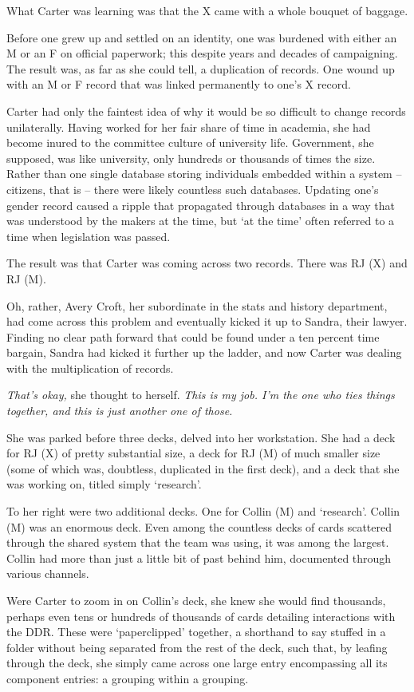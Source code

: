 What Carter was learning was that the X came with a whole bouquet of baggage.

Before one grew up and settled on an identity, one was burdened with either an M or an F on official paperwork; this despite years and decades of campaigning. The result was, as far as she could tell, a duplication of records. One wound up with an M or F record that was linked permanently to one's X record.

Carter had only the faintest idea of why it would be so difficult to change records unilaterally. Having worked for her fair share of time in academia, she had become inured to the committee culture of university life. Government, she supposed, was like university, only hundreds or thousands of times the size. Rather than one single database storing individuals embedded within a system -- citizens, that is -- there were likely countless such databases. Updating one's gender record caused a ripple that propagated through databases in a way that was understood by the makers at the time, but `at the time' often referred to a time when legislation was passed.

The result was that Carter was coming across two records. There was RJ (X) and RJ (M).

Oh, rather, Avery Croft, her subordinate in the stats and history department, had come across this problem and eventually kicked it up to Sandra, their lawyer. Finding no clear path forward that could be found under a ten percent time bargain, Sandra had kicked it further up the ladder, and now Carter was dealing with the multiplication of records.

\textit{That's okay,} she thought to herself. \textit{This is my job. I'm the one who ties things together, and this is just another one of those.}

She was parked before three decks, delved into her workstation. She had a deck for RJ (X) of pretty substantial size, a deck for RJ (M) of much smaller size (some of which was, doubtless, duplicated in the first deck), and a deck that she was working on, titled simply `research'.

To her right were two additional decks. One for Collin (M) and `research'. Collin (M) was an enormous deck. Even among the countless decks of cards scattered through the shared system that the team was using, it was among the largest. Collin had more than just a little bit of past behind him, documented through various channels.

Were Carter to zoom in on Collin's deck, she knew she would find thousands, perhaps even tens or hundreds of thousands of cards detailing interactions with the DDR. These were `paperclipped' together, a shorthand to say stuffed in a folder without being separated from the rest of the deck, such that, by leafing through the deck, she simply came across one large entry encompassing all its component entries: a grouping within a grouping.

